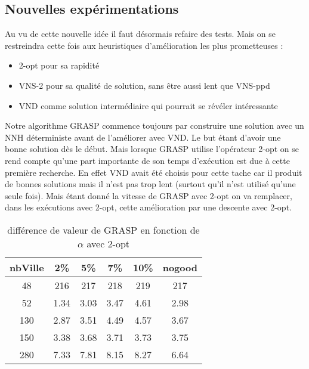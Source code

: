 \documentclass[12pt,a4paper]{article}
\begin{document}
\subsection{Nouvelles expérimentations}

Au vu de cette nouvelle idée il faut désormais refaire des tests. Mais on se restreindra cette fois aux heuristiques d'amélioration les plus prometteuses :
\begin{itemize}
\item
2-opt pour sa rapidité
\item
VNS-2 pour sa qualité de solution, sans être aussi lent que VNS-ppd
\item
VND comme solution intermédiaire qui pourrait se révéler intéressante
\end{itemize}

Notre algorithme GRASP commence toujours par construire une solution avec un NNH déterministe avant de l’améliorer avec VND. Le but étant d'avoir une bonne solution dès le début. Mais lorsque GRASP utilise l’opérateur 2-opt on se rend compte qu'une part importante de son temps d’exécution est due à cette première recherche. En effet VND avait été choisis pour cette tache car il produit de bonnes solutions mais il n'est pas trop lent (surtout qu'il n'est utilisé qu'une seule fois). Mais étant donné la vitesse de GRASP avec 2-opt on va remplacer, dans les exécutions avec 2-opt, cette amélioration par une descente avec 2-opt.

\begin{table}[!h]
\centering
\begin{tabular}{|*{6}{c|}}
  \hline
  nbVille & 2\% & 5\% & 7\% & 10\% & nogood \\
  \hline
  48 & 216 & 217 & 218 & 219 & 217 \\
  52 & 1.34 & 3.03 & 3.47 & 4.61 & 2.98 \\
  130 & 2.87 & 3.51 & 4.49 & 4.57 & 3.67 \\
  150 & 3.38 & 3.68 & 3.71 & 3.73 & 3.75 \\
  280 & 7.33 & 7.81 & 8.15 & 8.27 & 6.64 \\
  \hline
\end{tabular}
\caption{différence de valeur de GRASP en fonction de $\alpha$ avec 2-opt}
\label{recherchelocaleGRASPval2optproba}
\end{table}
\end{document}
